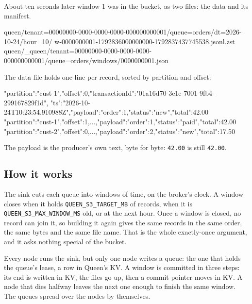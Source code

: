 About ten seconds later window 1 was in the bucket, as two files: the data and its manifest.

\begin{shell}
queen/tenant=00000000-0000-0000-0000-000000000001/queue=orders/dt=2026-10-24/hour=10/
  w-0000000001-1792836000000000-1792837437745538.jsonl.zst
queen/_queen/tenant=00000000-0000-0000-0000-000000000001/queue=orders/windows/0000000001.json
\end{shell}

The data file holds one line per record, sorted by partition and offset:

\begin{shell}
{"partition":"cust-1","offset":0,"transactionId":"01a16d70-3e1e-7001-9fb4-299167829f1d",
 "ts":"2026-10-24T10:23:54.910988Z","payload":{"order":1,"status":"new","total":42.00}}
{"partition":"cust-1","offset":1,...,"payload":{"order":1,"status":"paid","total":42.00}}
{"partition":"cust-2","offset":0,...,"payload":{"order":2,"status":"new","total":17.50}}
\end{shell}

The payload is the producer's own text, byte for byte: \texttt{42.00} is still \texttt{42.00}.

\subsection{How it works}

The sink cuts each queue into windows of time, on the broker's clock. A window closes when it holds
\texttt{QUEEN\_S3\_TARGET\_MB} of records, when it is \texttt{QUEEN\_S3\_MAX\_WINDOW\_MS} old, or at the
next hour. Once a window is closed, no record can join it, so building it again gives the same
records in the same order, the same bytes and the same file name. That is the whole exactly-once
argument, and it asks nothing special of the bucket.


Every node runs the sink, but only one node writes a queue: the one that holds the queue's lease, a
row in Queen's KV. A window is committed in three steps: its end is written in KV, the files go up,
then a commit pointer moves in KV. A node that dies halfway leaves the next one enough to finish the
same window. The queues spread over the nodes by themselves.

